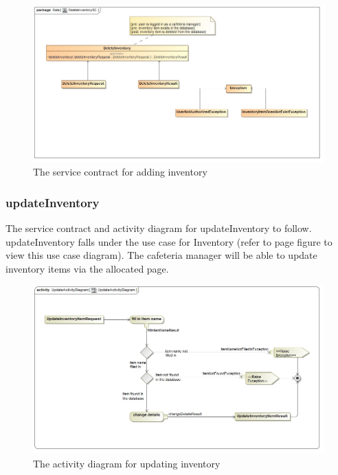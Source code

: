 \documentclass[a4paper,12pt]{report}
\begin{document}
\begin{figure}[H]
	\centering
	\includegraphics[width=1.0\textwidth]{../images/DeleteInventorySC.jpg}
	\caption{The service contract for adding inventory}
\end{figure}

\subsubsection{updateInventory}
The service contract and activity diagram for updateInventory to follow. updateInventory falls under the use case for Inventory (refer to page   figure   to view this use case diagram). The cafeteria manager will be able to update inventory items via the allocated page.
\begin{figure}[H]
  \centering
    \includegraphics[width=1.0\textwidth]{../images/UpdateActivityDiagram.jpg}
    \caption{The activity diagram for updating inventory} 
\end{figure}
\end{document}
